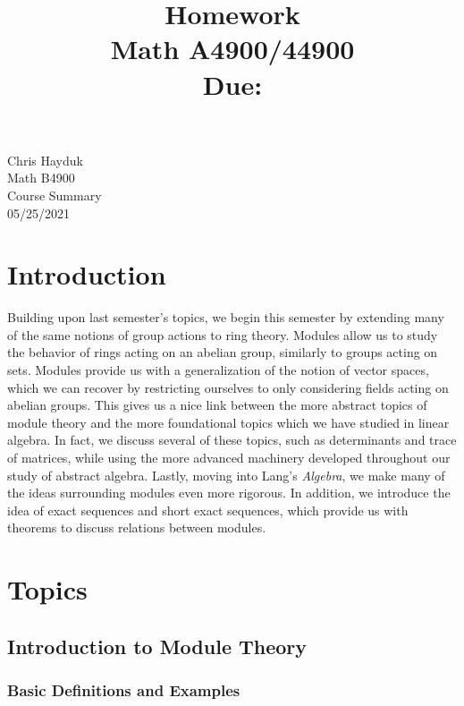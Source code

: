 \documentclass[11pt, reqno]{amsart}
\title[Homework \HW]{Homework \HW \\
Math A4900/44900\\
\small Due: \DUE}
\author{}
\theoremstyle{plain}
\theoremstyle{definition}
\theoremstyle{example}
\def\DUE{05/25/2021}
\begin{document}
\begin{flushright}
Chris Hayduk\\
Math B4900\\
Course Summary\\
\DUE
\end{flushright}

\section{Introduction}

Building upon last semester's topics, we begin this semester by extending many of the same notions of group actions to ring theory. Modules allow us to study the behavior of rings acting on an abelian group, similarly to groups acting on sets. Modules provide us with a generalization of the notion of vector spaces, which we can recover by restricting ourselves to only considering fields acting on abelian groups. This gives us a nice link between the more abstract topics of module theory and the more foundational topics which we have studied in linear algebra. In fact, we discuss several of these topics, such as determinants and trace of matrices, while using the more advanced machinery developed throughout our study of abstract algebra. Lastly, moving into Lang's \textit{Algebra}, we make many of the ideas surrounding modules even more rigorous. In addition, we introduce the idea of exact sequences and short exact sequences, which provide us with theorems to discuss relations between modules.

\newpage

\section{Topics}

\subsection{Introduction to Module Theory}

\subsubsection{Basic Definitions and Examples}
\end{document}
